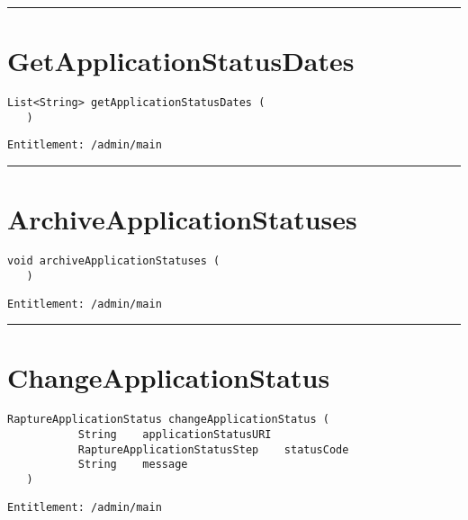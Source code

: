 \rule{12cm}{2pt}
\section{GetApplicationStatusDates}
\label{Api:GetApplicationStatusDates}
\begin{lstlisting}[style=nonumbers]
   List<String> getApplicationStatusDates (
   )
\end{lstlisting}
\begin{Verbatim}[formatcom=\color{Maroon}]
  Entitlement: /admin/main
\end{Verbatim}



\rule{12cm}{2pt}
\section{ArchiveApplicationStatuses}
\label{Api:ArchiveApplicationStatuses}
\begin{lstlisting}[style=nonumbers]
   void archiveApplicationStatuses (
   )
\end{lstlisting}
\begin{Verbatim}[formatcom=\color{Maroon}]
  Entitlement: /admin/main
\end{Verbatim}



\rule{12cm}{2pt}
\section{ChangeApplicationStatus}
\label{Api:ChangeApplicationStatus}
\begin{lstlisting}[style=nonumbers]
   RaptureApplicationStatus changeApplicationStatus (
           String    applicationStatusURI
           RaptureApplicationStatusStep    statusCode
           String    message
   )
\end{lstlisting}
\begin{Verbatim}[formatcom=\color{Maroon}]
  Entitlement: /admin/main
\end{Verbatim}



